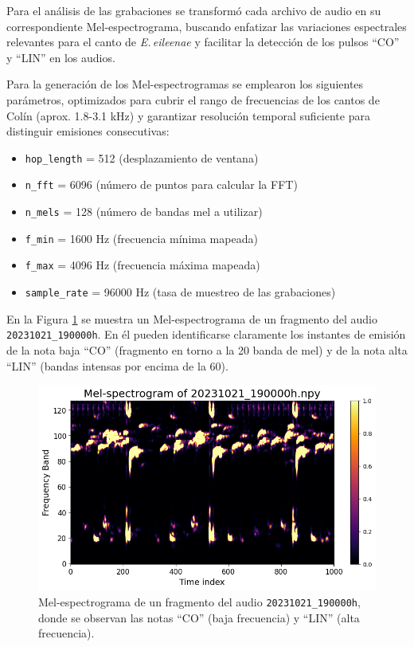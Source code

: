 Para el análisis de las grabaciones se transformó cada archivo 
de audio en su correspondiente Mel-espectrograma,
buscando enfatizar las variaciones espectrales relevantes 
para el canto de \emph{E.\,eileenae} y facilitar la detección de 
los pulsos “CO” y “LIN” en los audios.

Para la generación de los Mel-espectrogramas se emplearon los 
siguientes parámetros, optimizados para cubrir el rango de 
frecuencias de los cantos de Colín (aprox. 1.8-3.1 kHz) \cite{alonso2001llamadas} 
y garantizar resolución temporal suficiente para distinguir 
emisiones consecutivas:
\begin{itemize}
  \item \texttt{hop\_length} = 512 (desplazamiento de ventana)  
  \item \texttt{n\_fft} = 6096 (número de puntos para calcular la FFT)  
  \item \texttt{n\_mels} = 128 (número de bandas mel a utilizar)  
  \item \texttt{f\_min} = 1600 Hz (frecuencia mínima mapeada)  
  \item \texttt{f\_max} = 4096 Hz (frecuencia máxima mapeada)  
  \item \texttt{sample\_rate} = 96000 Hz (tasa de muestreo de las grabaciones)  
\end{itemize}

En la Figura \ref{fig:mel_example} se muestra un 
Mel-espectrograma de un fragmento del audio 
\texttt{20231021\_190000h}. En él pueden identificarse 
claramente los instantes de emisión de la nota baja “CO” 
(fragmento en torno a la 20 banda de mel) y de la nota alta “LIN” 
(bandas intensas por encima de la 60).

\begin{figure}[ht]
  \centering
  \includegraphics[width=0.9\linewidth]{Graphics/mel-spectrogram.png}
  \caption{Mel-espectrograma de un fragmento del audio \texttt{20231021\_190000h}, donde se observan las notas “CO” (baja frecuencia) y “LIN” (alta frecuencia).}
  \label{fig:mel_example}
\end{figure}







